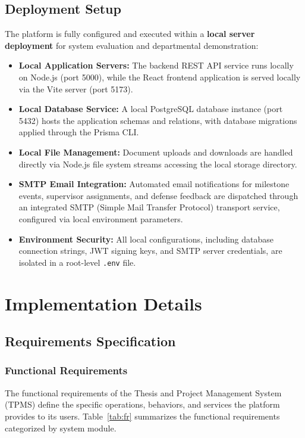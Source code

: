 \documentclass[12pt,a4paper]{report}
\begin{document}
\section{Deployment Setup}
The platform is fully configured and executed within a \textbf{local server deployment} for system evaluation and departmental demonstration:

\begin{itemize}
  \item \textbf{Local Application Servers:} The backend REST API service runs locally on Node.js (port 5000), while the React frontend application is served locally via the Vite server (port 5173).
  
  \item \textbf{Local Database Service:} A local PostgreSQL database instance (port 5432) hosts the application schemas and relations, with database migrations applied through the Prisma CLI.
  
  \item \textbf{Local File Management:} Document uploads and downloads are handled directly via Node.js file system streams accessing the local storage directory.
  
  \item \textbf{SMTP Email Integration:} Automated email notifications for milestone events, supervisor assignments, and defense feedback are dispatched through an integrated SMTP (Simple Mail Transfer Protocol) transport service, configured via local environment parameters.
  
  \item \textbf{Environment Security:} All local configurations, including database connection strings, JWT signing keys, and SMTP server credentials, are isolated in a root-level \texttt{.env} file.
\end{itemize}

\chapter{Implementation Details}

\section{Requirements Specification}

\subsection{Functional Requirements}
The functional requirements of the Thesis and Project Management System (TPMS) define the specific operations, behaviors, and services the platform provides to its users. Table~\ref{tab:fr} summarizes the functional requirements categorized by system module.
\end{document}
